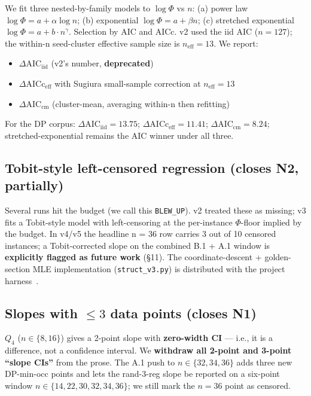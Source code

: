 \documentclass[11pt,a4paper]{article}
\theoremstyle{remark}
\begin{document}
We fit three nested-by-family models to $\log \Phi$ vs $n$:
(a) power law $\log \Phi = a + \alpha \log n$;
(b) exponential $\log \Phi = a + \beta n$;
(c) stretched exponential $\log \Phi = a + b \cdot n^\gamma$.
Selection by AIC and AICc. v2 used the iid AIC ($n = 127$); the within-n
seed-cluster effective sample size is $n_{\mathrm{eff}} = 13$. We report:

\begin{itemize}
\item $\Delta$AIC$_{\mathrm{iid}}$ (v2's number, \textbf{deprecated})
\item $\Delta$AICc$_{\mathrm{eff}}$ with Sugiura small-sample correction
at $n_{\mathrm{eff}} = 13$
\item $\Delta$AIC$_{\mathrm{cm}}$ (cluster-mean, averaging within-n then
refitting)
\end{itemize}

For the DP corpus: $\Delta$AIC$_{\mathrm{iid}} = 13.75$;
$\Delta$AICc$_{\mathrm{eff}} = \mathbf{11.41}$;
$\Delta$AIC$_{\mathrm{cm}} = \mathbf{8.24}$; stretched-exponential remains
the AIC winner under all three.

\subsection{Tobit-style left-censored regression (closes N2, partially)}

Several runs hit the budget (we call this \texttt{BLEW\_UP}). v2 treated
these as missing; v3 fits a Tobit-style model with left-censoring at the
per-instance $\Phi$-floor implied by the budget. In v4/v5 the headline
n = 36 row carries 3 out of 10 censored instances; a Tobit-corrected
slope on the combined B.1 + A.1 window is \textbf{explicitly flagged as
future work} (\S11). The coordinate-descent + golden-section MLE
implementation (\texttt{struct\_v3.py}) is distributed with the project
harness~\cite{KublerSperimentalMath}.

\subsection{Slopes with $\le 3$ data points (closes N1)}

$Q_4$ ($n \in \{8, 16\}$) gives a 2-point slope with \textbf{zero-width
CI} --- i.e., it is a difference, not a confidence interval. We
\textbf{withdraw all 2-point and 3-point ``slope CIs''} from the prose.
The A.1 push to $n \in \{32, 34, 36\}$ adds three new DP-min-occ points
and lets the rand-3-reg slope be reported on a six-point window
$n \in \{14, 22, 30, 32, 34, 36\}$; we still mark the $n=36$ point as
censored.
\end{document}
